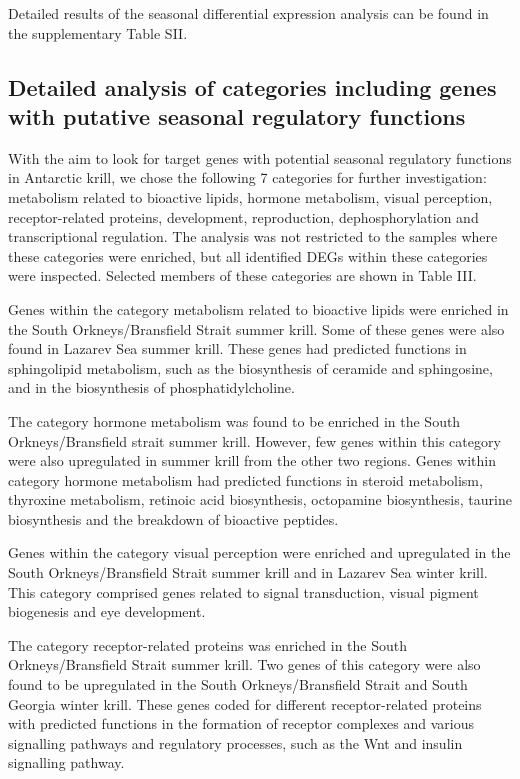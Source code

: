 Detailed  results of the seasonal differential expression analysis
can be found in the supplementary Table SII.

\subsection{Detailed analysis of categories including genes with putative seasonal regulatory functions}

With the aim to look for target genes with potential seasonal regulatory
functions in Antarctic krill, we chose the following 7 categories for further
investigation: metabolism related to bioactive lipids, hormone metabolism,
visual perception, receptor-related proteins, development, reproduction,
dephosphorylation and transcriptional regulation. The analysis was not
restricted to the samples where these categories were enriched, but all
identified DEGs within these categories were inspected. Selected members of
these categories are shown in Table III. 

Genes within the category metabolism related to bioactive lipids were enriched
in the South Orkneys/Bransfield Strait summer krill. Some of these genes were
also found in Lazarev Sea summer krill. These genes had predicted functions in
sphingolipid metabolism, such as the biosynthesis of ceramide and sphingosine,
and in the biosynthesis of phosphatidylcholine.

The category hormone metabolism was found to be enriched in the South
Orkneys/Bransfield strait summer krill. However, few genes within this category
were also upregulated in summer krill from the other two regions. Genes within
category hormone metabolism had predicted functions in steroid metabolism,
thyroxine metabolism, retinoic acid biosynthesis, octopamine biosynthesis,
taurine biosynthesis and the breakdown of bioactive peptides.

Genes within the category visual perception were enriched and upregulated in
the South Orkneys/Bransfield Strait summer krill and in Lazarev Sea winter
krill. This category comprised genes related to signal transduction, visual
pigment biogenesis and eye development.

The category receptor-related proteins was enriched in the South
Orkneys/Bransfield Strait summer krill. Two genes of this category were also
found to be upregulated in the South Orkneys/Bransfield Strait and South
Georgia winter krill. These genes coded for different receptor-related proteins
with predicted functions in the formation of receptor complexes and various
signalling pathways and regulatory processes, such as the Wnt and insulin
signalling pathway.

